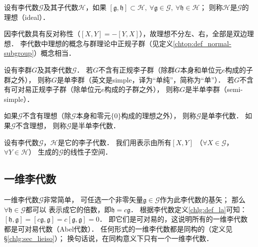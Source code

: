 \begin{definition}
    设有李代数$\mathscr{G}$及其子代数$\mathscr{H}$，如果
    $   [\mathfrak{g},\mathfrak{h}]\subset  \mathscr{H},\ 
    \forall \mathfrak{g}\in \mathscr{G}, \ \forall\mathfrak{h}\in\mathscr{H}$；
    则称$\mathscr{H}$是$\mathscr{G}$的{\heiti 理想}（ideal）．
\end{definition}
因李代数具有反对称性（$[X,Y]=-[Y,X]$），故理想不分左、右，全部是双边理想．
李代数中理想的概念与群理论中正规子群（见定义\ref{chtop:def_normal-subgroup}）概念相当．




\begin{definition}
    设有李群$G$及其李代数$\mathscr{G}$．
    若$G$不含有正规李子群（除群$G$本身和单位元$e$构成的子群之外），
    则称$G$是{\heiti 单李群}（英文是simple，译为“单纯”，简称为“单”）．
    若$G$不含有{\kaishu 可对易}正规李子群（除单位元$e$构成的子群之外），
    则称$G$是{\heiti 半单李群}（semi-simple）．
\end{definition}

\begin{definition}    
    如果$\mathscr{G}$不含有理想（除$\mathscr{G}$本身和零元$\{0\}$构成的理想之外），
    则称$\mathscr{G}$是{\heiti 单李代数}．
    如果$\mathscr{G}$不含理想，
    则称$\mathscr{G}$是{\heiti 半单李代数}．
\end{definition}


设有李代数$\mathscr{G}$，$\mathscr{H}$是它的李子代数．
我们用表示由所有$[X,Y]$
（$\forall X\in \mathscr{G}$，$\forall Y\in\mathscr{H}$）
生成的$\mathscr{G}$的线性子空间．

\subsection{一维李代数}
一维李代数$\mathscr{G}$非常简单，
可任选一个非零矢量$\mathfrak{g}\in \mathscr{G}$作为此李代数的基矢；
那么$\forall \mathfrak{h}\in \mathscr{G}$都可以
表示成它的倍数，即$\mathfrak{h} = c \mathfrak{g}$．
根据李代数定义\ref{chlg:def_la}可知：
$[\mathfrak{h},\mathfrak{g}]= [c\mathfrak{g},\mathfrak{g}] = c[\mathfrak{g},\mathfrak{g}] =0 $．
即它们是可对易的，这说明所有的一维李代数都是可对易代数（Abel代数）．
任何形式的一维李代数都是同构的（定义见\S\ref{chlg:sec_lieiso}）；
换句话说，在同构意义下只有一个一维李代数．

